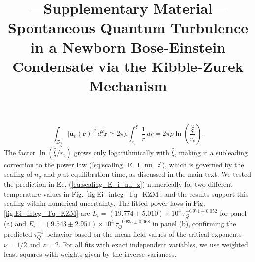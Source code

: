 \documentclass[aps,prl,twocolumn,showpacs,notitlepage,floatfix,superscriptaddress]{revtex4-1}
\makeatletter
\def\maketitle{
\@author@finish
\title@column\titleblock@produce
\suppressfloats[t]}
\makeatother
\begin{document}
\begin{equation}
    \int_{\mathcal{D}_{\hat{\xi}}}\!\left\vert \boldsymbol{u}_v(\boldsymbol{r})\right\vert^2 \,d^2\boldsymbol{r}
    \simeq
    2 \pi
    \rho
    \int_{r_{v}}^{\hat{\xi}}\frac{1}{r}\, dr=
    2 \pi
    \rho
    \ln\left(\frac{\hat{\xi}}{r_v}\right).
\end{equation}
The factor $\ln(\hat{\xi}/r_v)$ grows only logarithmically with $\hat{\xi}$, making it a subleading correction to the power law (\ref{eq:scaling_E_i_nu_z}), which is governed by the scaling of $n_v$ and $\rho$ at equilibration time, as discussed in the main text.
We tested the prediction in Eq. (\ref{eq:scaling_E_i_nu_z}) numerically for two different temperature values in Fig. \ref{fig:Ei_integ_Tq_KZM}, and the results support this scaling within numerical uncertainty. The fitted power laws in Fig. \ref{fig:Ei_integ_Tq_KZM} are  $E_i = (19.774 \pm 5.010) \times 10^4 \,\tau_Q^{-0.971 \pm 0.052}$ for panel (a) and $E_i = (9.543 \pm 2.951) \times 10^4 \,\tau_Q^{-0.935 \pm 0.068}$ in panel (b), confirming the predicted $\tau_Q^{-1}$ behavior
based on the mean-field values of the critical exponents $\nu = 1/2$ and $z = 2$.
For all fits with exact independent variables, we use weighted least squares with weights given by the inverse variances.

\newpage
\clearpage

\title{---Supplementary Material--- \\Spontaneous Quantum Turbulence in a Newborn Bose-Einstein Condensate via the Kibble-Zurek Mechanism
}
\maketitle
\onecolumngrid
\end{document}
